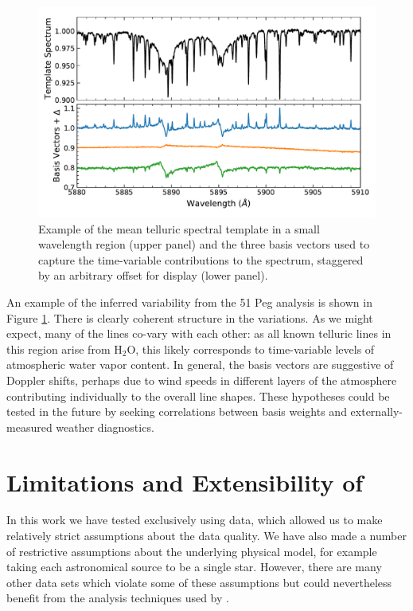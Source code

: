 \documentclass[modern]{aastex62}
\begin{document}
\begin{figure}
\centering
\includegraphics[width=5in]{telluric_basis2}
\caption{Example of the mean telluric spectral template in a small wavelength region (upper panel) and the three basis vectors used to capture the time-variable contributions to the spectrum, staggered by an arbitrary offset for display (lower panel).}
\label{fig:telluric_basis}
\end{figure}

An example of the inferred variability from the 51 Peg analysis is shown in Figure \ref{fig:telluric_basis}. 
There is clearly coherent structure in the variations. 
As we might expect, many of the lines co-vary with each other: as all known telluric lines in this region arise from H$_2$O, this likely corresponds to time-variable levels of atmospheric water vapor content. 
In general, the basis vectors are suggestive of Doppler shifts, perhaps due to wind speeds in different layers of the atmosphere contributing individually to the overall line shapes. 
These hypotheses could be tested in the future by seeking correlations between basis weights and externally-measured weather diagnostics. 


\section{Limitations and Extensibility of \wobble}
\label{s:future}

In this work we have tested \wobble exclusively using \HARPS data, which allowed us to make relatively strict assumptions about the data quality. 
We have also made a number of restrictive assumptions about the underlying physical model, for example taking each astronomical source to be a single star. 
However, there are many other \EPRV data sets which violate some of these assumptions but could nevertheless benefit from the analysis techniques used by \wobble.
 
\end{document}
